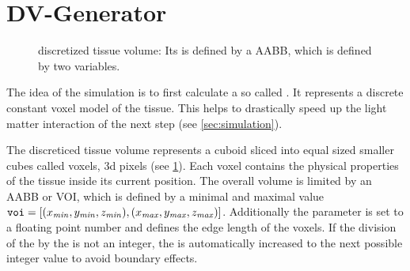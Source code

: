\section{DV-Generator}
\label{sec:dv_generator}
% 
\begin{figure}[!t]
\centering
\setlength{\tikzwidth}{0.5\textwidth}
\caption[discreticed tissue volume]{discretized tissue volume: Its \dummy{} is defined by a \ac{AABB}, which is defined by two variables. }
\label{fig:discVol}
\end{figure}
% 
% 
The idea of the simulation is to first calculate a so called .
It represents a discrete constant voxel model of the tissue.
This helps to drastically speed up the light matter interaction of the next step (see \cref{sec:simulation}).
\par
% 
The discreticed tissue volume represents a cuboid sliced into equal sized smaller cubes called voxels, \ie 3d pixels (see \cref{fig:discVol}).
Each voxel contains the physical properties of the tissue inside its current position.
The overall volume is limited by an \ac{AABB} or \ac{VOI}, which is defined by a minimal and maximal value $\texttt{voi} = [(x_{\mathit{min}}, y_{\mathit{min}}, z_{\mathit{min}}),(x_{\mathit{max}}, y_{\mathit{max}}, z_{\mathit{max}})]$.
Additionally the \voxelsize{} parameter \voxels{} is set to a floating point number and defines the edge length of the voxels.
If the division of the \voi{} by the \voxelsize{} is not an integer, the \voi{} is automatically increased to the next possible integer value to avoid boundary effects.
% 
% 
% 
